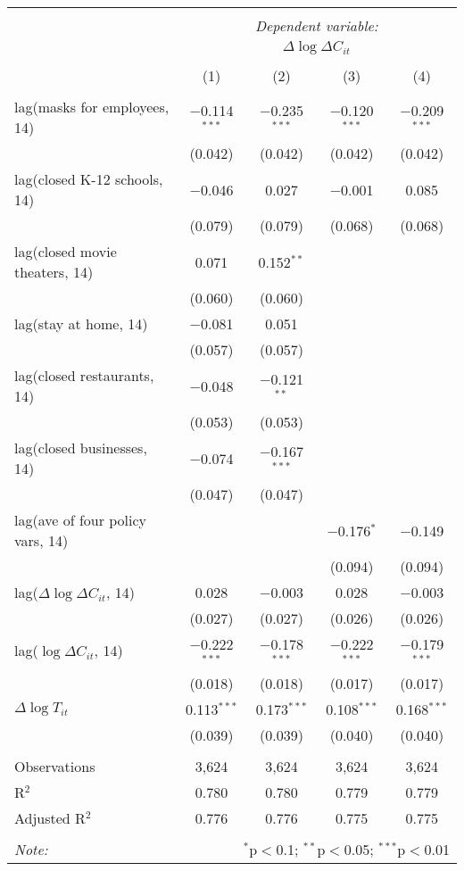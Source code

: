 \begin{tabular}{@{\extracolsep{1pt}}lcccc} 
\\[-1.8ex]\hline 
\hline \\[-1.8ex] 
 & \multicolumn{4}{c}{\textit{Dependent variable:}} \\ 
\cline{2-5} 
 & \multicolumn{4}{c}{$\Delta \log \Delta C_{it}$} \\ 
\\[-1.8ex] & (1) & (2) & (3) & (4)\\ 
\hline \\[-1.8ex] 
 lag(masks for employees, 14) & $-$0.114$^{***}$ & $-$0.235$^{***}$ & $-$0.120$^{***}$ & $-$0.209$^{***}$ \\ 
  & (0.042) & (0.042) & (0.042) & (0.042) \\ 
  lag(closed K-12 schools, 14) & $-$0.046 & 0.027 & $-$0.001 & 0.085 \\ 
  & (0.079) & (0.079) & (0.068) & (0.068) \\ 
  lag(closed movie theaters, 14) & 0.071 & 0.152$^{**}$ &  &  \\ 
  & (0.060) & (0.060) &  &  \\ 
  lag(stay at home, 14) & $-$0.081 & 0.051 &  &  \\ 
  & (0.057) & (0.057) &  &  \\ 
  lag(closed restaurants, 14) & $-$0.048 & $-$0.121$^{**}$ &  &  \\ 
  & (0.053) & (0.053) &  &  \\ 
  lag(closed businesses, 14) & $-$0.074 & $-$0.167$^{***}$ &  &  \\ 
  & (0.047) & (0.047) &  &  \\ 
  lag(ave of four policy vars, 14) &  &  & $-$0.176$^{*}$ & $-$0.149 \\ 
  &  &  & (0.094) & (0.094) \\ 
  lag($\Delta \log \Delta C_{it}$, 14) & 0.028 & $-$0.003 & 0.028 & $-$0.003 \\ 
  & (0.027) & (0.027) & (0.026) & (0.026) \\ 
  lag($\log \Delta C_{it}$, 14) & $-$0.222$^{***}$ & $-$0.178$^{***}$ & $-$0.222$^{***}$ & $-$0.179$^{***}$ \\ 
  & (0.018) & (0.018) & (0.017) & (0.017) \\ 
  $\Delta \log T_{it}$ & 0.113$^{***}$ & 0.173$^{***}$ & 0.108$^{***}$ & 0.168$^{***}$ \\ 
  & (0.039) & (0.039) & (0.040) & (0.040) \\ 
 \hline \\[-1.8ex] 
Observations & 3,624 & 3,624 & 3,624 & 3,624 \\ 
R$^{2}$ & 0.780 & 0.780 & 0.779 & 0.779 \\ 
Adjusted R$^{2}$ & 0.776 & 0.776 & 0.775 & 0.775 \\ 
\hline 
\hline \\[-1.8ex] 
\textit{Note:}  & \multicolumn{4}{r}{$^{*}$p$<$0.1; $^{**}$p$<$0.05; $^{***}$p$<$0.01} \\ 
\end{tabular} 